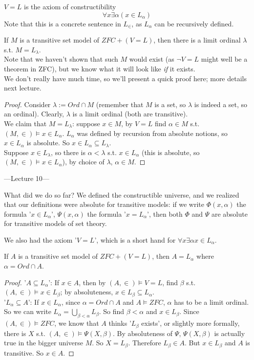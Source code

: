 \documentclass[a4paper]{article}
\begin{document}
\begin{defi}
$V=L$ is the axiom of constructibility
\[
\forall x \exists \alpha (x \in L_\alpha)
\]
Note that this is a concrete sentence in $L_\in$, as $L_\alpha$ can be recursively defined.
\end{defi}

\begin{lemma}
If $M$ is a transitive set model of $ZFC+(V=L)$, then there is a limit ordinal $\lambda$ s.t. $M=L_\lambda$.\\
Note that we haven't shown that such $M$ would exist (as $\neg V=L$ might well be a theorem in ZFC), but we know what it will look like \emph{if} it exists.\\
We don't really have much time, so we'll present a quick proof here; more details next lecture.
\begin{proof}
Consider $\lambda:= Ord \cap M$ (remember that $M$ is a set, so $\lambda$ is indeed a set, so an ordinal). Clearly, $\lambda$ is a limit ordinal (both are transitive).\\
We claim that $M=L_\lambda$: suppose $x \in M$, by $V=L$ find $\alpha \in M$ s.t. $(M,\in) \vDash x \in L_\alpha$. $L_\alpha$ was defined by recursion from absolute notions, so $x \in L_\alpha$ is absolute. So $x \in L_\alpha \subseteq L_\lambda$.\\
Suppose $x \in L_\lambda$, so there is $\alpha < \lambda$ s.t. $x \in L_\alpha$ (this is absolute, so $(M,\in) \vDash x \in L_\alpha$), by choice of $\lambda$, $\alpha \in M$.
\end{proof}
\end{lemma}

---Lecture 10---

What did we do so far? We defined the constructible universe, and we realized that our definitions were absolute for transitive models: if we write $\Phi(x,\alpha)$ the formula '$x \in L_\alpha$', $\Psi(x,\alpha)$ the formula '$x=L_\alpha$', then both $\Phi$ and $\Psi$ are absolute for transitive models of set theory.

We also had the axiom '$V=L$', which is a short hand for $\forall x \exists \alpha x\in L_\alpha$.

\begin{prop}
If $A$ is a transitive set model of $ZFC+(V=L)$, then $A=L_\alpha$ where $\alpha = Ord \cap A$.
\begin{proof}
'$A \subseteq L_\alpha$': If $x \in A$, then by $(A,\in) \vDash V=L$, find $\beta$ s.t. $(A,\in) \vDash x \in L_\beta$; by absoluteness, $x \in L_\beta \subseteq L_\alpha$.\\
'$L_\alpha \subseteq A$': If $x \in L_\alpha$, since $\alpha = Ord\cap A$ and $A \vDash ZFC$, $\alpha$ has to be a limit ordinal. So we can write $L_\alpha = \bigcup_{\beta < \alpha} L_\beta$. So find $\beta < \alpha$ and $x \in L_\beta$. Since $(A,\in) \vDash ZFC$, we know that $A$ thinks '$L_\beta$ exists', or slightly more formally, there is $X$ s.t. $(A,\in) \vDash \Psi(X,\beta)$. By absoluteness of $\Psi$, $\Psi(X,\beta)$ is actually true in the bigger universe $M$. So $X=L_\beta$. Therefore $L_\beta \in A$. But $x \in L_\beta$ and $A$ is transitive. So $x \in A$.
\end{proof}
\end{prop}
\end{document}
